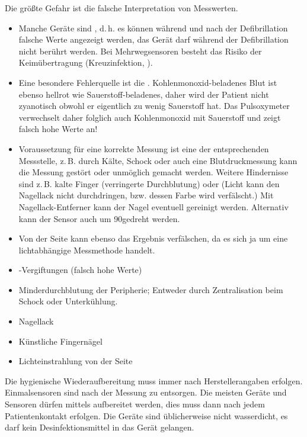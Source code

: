 {%
Die größte Gefahr ist die falsche Interpretation von
Messwerten. 

\begin{itemize}
  \item Manche Geräte sind ,
  d.\,h. es können während und nach der Defibrillation
  falsche Werte angezeigt werden, das Gerät darf während der
  Defibrillation nicht berührt werden. Bei Mehrwegsensoren
  besteht das Risiko der Keimübertragung (Kreuzinfektion,
  ).
  \item Eine besondere Fehlerquelle ist die
  .
  Kohlenmonoxid-beladenes Blut ist ebenso hellrot wie
  Sauerstoff-beladenes, daher wird der Patient nicht
  zyanotisch obwohl er eigentlich zu wenig Sauerstoff hat.
  Das Pulsoxymeter verwechselt daher folglich auch
  Kohlenmonoxid mit Sauerstoff und zeigt falsch hohe Werte
  an!
  \item Voraussetzung für eine korrekte Messung ist eine
   der entsprechenden
  Messstelle, z.\,B. durch Kälte, Schock oder auch eine
  Blutdruckmessung kann die Messung gestört oder unmöglich
  gemacht werden. Weitere Hindernisse sind z.\,B. kalte
  Finger (verringerte Durchblutung) oder 
  (Licht kann den Nagellack nicht durchdringen, bzw. dessen
  Farbe wird verfälscht.) Mit Nagellack-Entferner kann der
  Nagel eventuell gereinigt werden. Alternativ kann der
  Sensor auch um 90\Deg gedreht werden.
  \item Von der Seite  kann ebenso
  das Ergebnis verfälschen, da es sich ja um eine lichtabhängige
  Messmethode handelt.
\end{itemize}

}{
\begin{itemize}
  \item {}-Vergiftungen (falsch hohe Werte)
  \item Minderdurchblutung der Peripherie; Entweder durch
  Zentralisation beim Schock oder Unterkühlung.
  \item Nagellack
  \item Künstliche Fingernägel
  \item Lichteinstrahlung von der Seite
\end{itemize}
}{}{}{}



{%
Die hygienische Wiederaufbereitung muss immer nach
Herstellerangaben erfolgen.
Einmalsensoren sind nach der Messung zu entsorgen.
Die meisten Geräte und Sensoren dürfen mittels
aufbereitet werden, dies muss dann nach jedem Patientenkontakt erfolgen. 
Die Geräte sind üblicherweise nicht
wasserdicht, es darf kein Desinfektionsmittel in das Gerät
gelangen.
}{}{}{}{}








